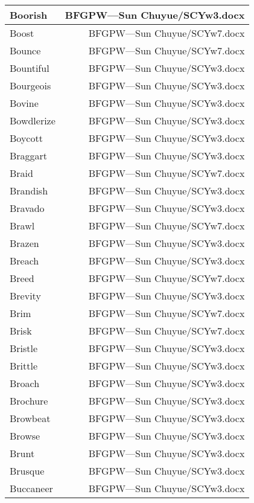 \documentclass{article}
\begin{document}
\begin{center}
\begin{longtable}{|l|r|}
\hline
Boorish  &  BFGPW---Sun Chuyue/SCYw3.docx\\  
\hline
Boost  &  BFGPW---Sun Chuyue/SCYw7.docx\\  
\hline
Bounce  &  BFGPW---Sun Chuyue/SCYw7.docx\\  
\hline
Bountiful  &  BFGPW---Sun Chuyue/SCYw3.docx\\  
\hline
Bourgeois  &  BFGPW---Sun Chuyue/SCYw3.docx\\  
\hline
Bovine  &  BFGPW---Sun Chuyue/SCYw3.docx\\  
\hline
Bowdlerize  &  BFGPW---Sun Chuyue/SCYw3.docx\\  
\hline
Boycott  &  BFGPW---Sun Chuyue/SCYw3.docx\\  
\hline
Braggart  &  BFGPW---Sun Chuyue/SCYw3.docx\\  
\hline
Braid  &  BFGPW---Sun Chuyue/SCYw7.docx\\  
\hline
Brandish  &  BFGPW---Sun Chuyue/SCYw3.docx\\  
\hline
Bravado  &  BFGPW---Sun Chuyue/SCYw3.docx\\  
\hline
Brawl  &  BFGPW---Sun Chuyue/SCYw7.docx\\  
\hline
Brazen  &  BFGPW---Sun Chuyue/SCYw3.docx\\  
\hline
Breach  &  BFGPW---Sun Chuyue/SCYw3.docx\\  
\hline
Breed  &  BFGPW---Sun Chuyue/SCYw7.docx\\  
\hline
Brevity  &  BFGPW---Sun Chuyue/SCYw3.docx\\  
\hline
Brim  &  BFGPW---Sun Chuyue/SCYw7.docx\\  
\hline
Brisk  &  BFGPW---Sun Chuyue/SCYw7.docx\\  
\hline
Bristle  &  BFGPW---Sun Chuyue/SCYw3.docx\\  
\hline
Brittle  &  BFGPW---Sun Chuyue/SCYw3.docx\\  
\hline
Broach  &  BFGPW---Sun Chuyue/SCYw3.docx\\  
\hline
Brochure  &  BFGPW---Sun Chuyue/SCYw3.docx\\  
\hline
Browbeat  &  BFGPW---Sun Chuyue/SCYw3.docx\\  
\hline
Browse  &  BFGPW---Sun Chuyue/SCYw3.docx\\  
\hline
Brunt  &  BFGPW---Sun Chuyue/SCYw3.docx\\  
\hline
Brusque  &  BFGPW---Sun Chuyue/SCYw3.docx\\  
\hline
Buccaneer  &  BFGPW---Sun Chuyue/SCYw3.docx\\  
\hline

\end{longtable}
\end{center}
\end{document}

